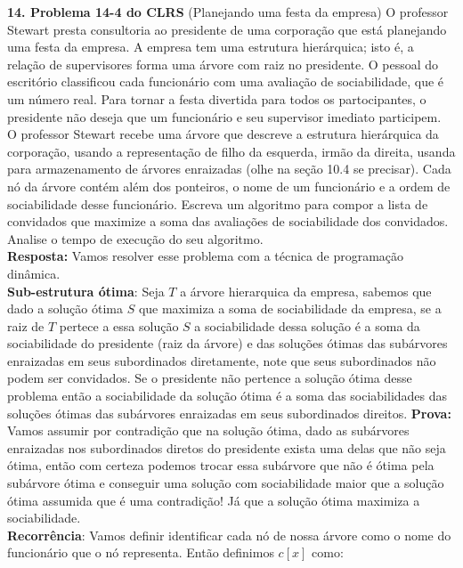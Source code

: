 
\noindent \textbf{14. Problema 14-4 do CLRS} (Planejando uma festa da empresa) 
O professor Stewart presta consultoria ao presidente de uma corporação que 
está planejando uma festa da empresa. A empresa tem uma estrutura hierárquica; 
isto é, a relação de supervisores forma uma árvore com raiz no presidente. O 
pessoal do escritório classificou cada funcionário com uma avaliação de 
sociabilidade, que é um número real. Para tornar a festa divertida para todos 
os partocipantes, o presidente não deseja que um funcionário e seu supervisor 
imediato participem.
\\[6pt]
\noindent O professor Stewart recebe uma árvore que descreve a estrutura 
hierárquica da corporação, usando a representação de filho da esquerda, irmão 
da direita, usanda para armazenamento de árvores enraizadas (olhe na seção 
10.4 se precisar). Cada nó da árvore contém além dos ponteiros, o nome de um 
funcionário e a ordem de sociabilidade desse funcionário. Escreva um algoritmo 
para compor a lista de convidados que maximize a soma das avaliações de 
sociabilidade dos convidados. Analise o tempo de execução do seu algoritmo.
\\[6pt]
\noindent \textbf{Resposta: } Vamos resolver esse problema com a técnica de 
programação dinâmica.
\\[6pt]
\noindent \textbf{Sub-estrutura ótima}: Seja $T$ a árvore hierarquica da 
empresa, sabemos que dado a solução ótima $S$ que maximiza a soma de 
sociabilidade da empresa, se a raiz de $T$ pertece a essa solução $S$ a 
sociabilidade dessa solução é a soma da sociabilidade do presidente (raiz da 
árvore) e das soluções ótimas das subárvores enraizadas em seus subordinados 
diretamente, note que seus subordinados não podem ser convidados. Se o 
presidente não pertence a solução ótima desse problema então a sociabilidade da 
solução ótima é a soma das sociabilidades das soluções ótimas das subárvores 
enraizadas em seus subordinados direitos. \textbf{Prova:} Vamos assumir por 
contradição que na solução ótima, dado as subárvores enraizadas nos 
subordinados diretos do presidente exista uma delas que não seja ótima, então 
com certeza podemos trocar essa subárvore que não é ótima pela subárvore ótima 
e conseguir uma solução com sociabilidade maior que a solução ótima assumida 
que é uma contradição! Já que a solução ótima maximiza a sociabilidade.
\\[6pt]
\noindent \textbf{Recorrência}: Vamos definir identificar cada nó de nossa 
árvore como o nome do funcionário que o nó representa. Então definimos $c[x]$ 
como:

